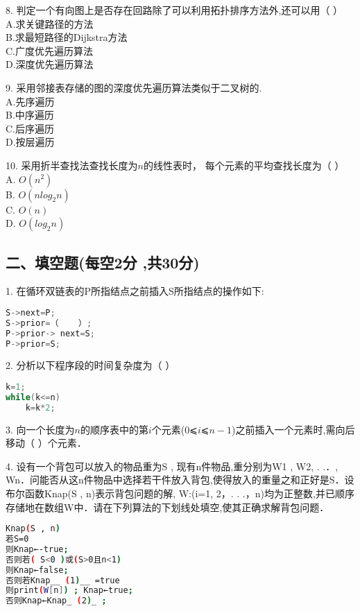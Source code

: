 8. 判定一个有向图上是否存在回路除了可以利用拓扑排序方法外,还可以用（    ）  \\
A.求关键路径的方法 \\
B.求最短路径的Dijkstra方法 \\
C.广度优先遍历算法 \\
D.深度优先遍历算法

9. 采用邻接表存储的图的深度优先遍历算法类似于二叉树的. \\
A.先序遍历 \\
B.中序遍历 \\
C.后序遍历 \\
D.按层遍历

10. 采用折半查找法查找长度为$n$的线性表时， 每个元素的平均查找长度为（    ）  \\
A. $O(n^2)$ \\
B. $O(nlog_2n)$ \\
C. $O(n)$ \\
D. $O(log_2n)$

\subsection{二、填空题(每空2分 ,共30分)}

1. 在循环双链表的P所指结点之前插入S所指结点的操作如下: \\
\begin{lstlisting}[language=cpp]
S->next=P;
S->prior=（    ）;
P->prior-> next=S;
P->prior=S;
\end{lstlisting}

2. 分析以下程序段的时间复杂度为（    ）  \\
\begin{lstlisting}[language=cpp]
k=1;
while(k<=n)
    k=k*2;
\end{lstlisting}

3. 向一个长度为$n$的顺序表中的第$i$个元素($0$⩽$i$⩽$n-1$)之前插入一个元素时,需向后移动（    ）个元素．

4. 设有一个背包可以放入的物品重为S , 现有n件物品,重分别为W1 , W2, . .．, Wn．问能否从这n件物品中选择若干件放入背包,使得放入的重量之和正好是S．设布尔函数Knap(S , n)表示背包问题的解, W:(i=1, 2，. . .，n)均为正整数,并已顺序存储地在数组W中．请在下列算法的下划线处填空,使其正确求解背包问题．
\begin{lstlisting}[language=bash]
Knap(S , n)
若S=0
则Knap←-true;
否则若( S<0 )或(S>0且n<1)
则Knap←false;
否则若Knap__ (1)__ =true
则print(W[n]) ; Knap←true;
否则Knap←Knap_ (2)_ ;
\end{lstlisting}

